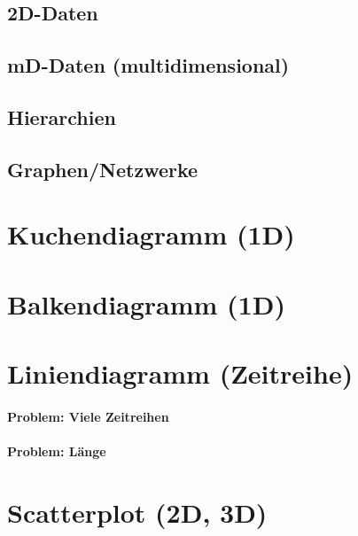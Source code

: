 \documentclass[a4paper, 11pt, accentcolor = tud3b]{tudreport}
\begin{document}
			\subsection{2D-Daten} %

			\subsection{mD-Daten (multidimensional)} %

			\subsection{Hierarchien} %

			\subsection{Graphen/Netzwerke} %

		\section{Kuchendiagramm (1D)} %

		\section{Balkendiagramm (1D)} %

		\section{Liniendiagramm (Zeitreihe)} %

			\paragraph{Problem: Viele Zeitreihen} %

			\paragraph{Problem: Länge} %

		\section{Scatterplot (2D, 3D)} %
\end{document}

